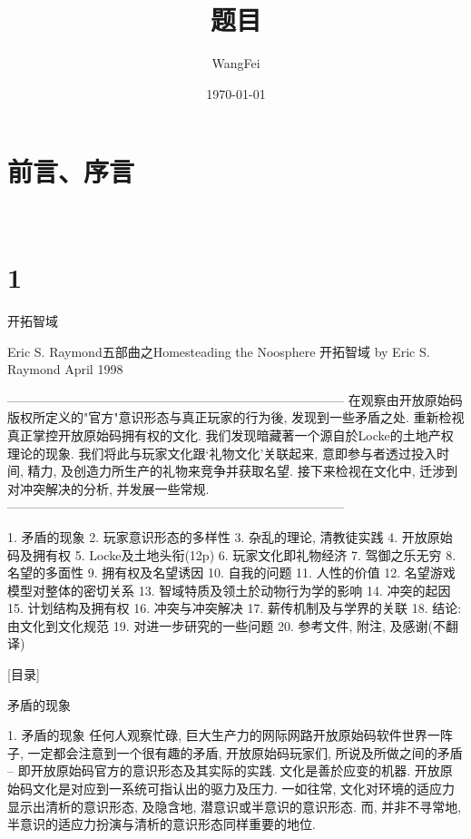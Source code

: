 \documentclass[a4paper,12pt,UTF8,twoside]{ctexbook}
\title{\heiti\zihao{0} 题目}
\author{WangFei}
\date{\today}
\begin{document}
\maketitle
\tableofcontents

\frontmatter
\chapter{前言、序言}

\mainmatter

~\\

 \qquad  

\chapter{1}

开拓智域

Eric S. Raymond五部曲之Homesteading the Noosphere
开拓智域
by Eric S. Raymond
April 1998

--------------------------------------------------------------------------------
在观察由开放原始码版权所定义的"官方"意识形态与真正玩家的行为後, 发现到一些矛盾之处.  重新检视真正掌控开放原始码拥有权的文化.  我们发现暗藏著一个源自於Locke的土地产权理论的现象. 我们将此与玩家文化跟`礼物文化'关联起来, 意即参与者透过投入时间, 精力, 及创造力所生产的礼物来竞争并获取名望. 接下来检视在文化中, 迁涉到对冲突解决的分析, 并发展一些常规.
--------------------------------------------------------------------------------

1. 矛盾的现象
2. 玩家意识形态的多样性
3. 杂乱的理论, 清教徒实践
4. 开放原始码及拥有权
5. Locke及土地头衔(12p)
6. 玩家文化即礼物经济
7. 驾御之乐无穷
8. 名望的多面性
9. 拥有权及名望诱因
10. 自我的问题
11. 人性的价值
12. 名望游戏模型对整体的密切关系
13. 智域特质及领土於动物行为学的影响
14. 冲突的起因
15. 计划结构及拥有权
16. 冲突与冲突解决
17. 薪传机制及与学界的关联
18. 结论: 由文化到文化规范
19. 对进一步研究的一些问题
20. 参考文件, 附注, 及感谢(不翻译)

[目录]

矛盾的现象

1. 矛盾的现象
任何人观察忙碌, 巨大生产力的网际网路开放原始码软件世界一阵子, 一定都会注意到一个很有趣的矛盾, 开放原始码玩家们, 所说及所做之间的矛盾 -- 即开放原始码官方的意识形态及其实际的实践.
文化是善於应变的机器. 开放原始码文化是对应到一系统可指认出的驱力及压力. 一如往常, 文化对环境的适应力显示出清析的意识形态, 及隐含地, 潜意识或半意识的意识形态. 而, 并非不寻常地, 半意识的适应力扮演与清析的意识形态同样重要的地位.
\end{document}
